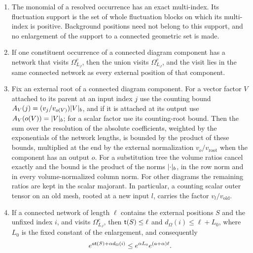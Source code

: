 \begin{lemma}
\begin{enumerate}
\[\]
\item The monomial of a resolved occurrence has an exact multi-index. Its fluctuation support is the set of whole fluctuation blocks on which its multi-index is positive. Background positions need not belong to this support, and no enlargement of the support to a connected geometric set is made.
\item If one constituent occurrence of a connected diagram component has a network that visits $\Omega^c_{L_J}$, then the union visits $\Omega^c_{L_J}$, and the visit lies in the same connected network as every external position of that component.
\item Fix an external root of a connected diagram component. For a vector factor $V$ attached to its parent at an input index $j$ use the counting bound $A_V(j)=(v_j/v_{o(V)})\lvert V\rvert_b$, and if it is attached at its output use $A_V(o(V))=\lvert V\rvert_b$; for a scalar factor use its counting-root bound. Then the sum over the resolution of the absolute coefficients, weighted by the exponentials of the network lengths, is bounded by the product of these bounds, multiplied at the end by the external normalization $v_{o}/v_{\mathrm{root}}$ when the component has an output $o$. For a substitution tree the volume ratios cancel exactly and the bound is the product of the norms $\lvert \cdot\rvert_b$, in the row norm and in every volume-normalized column norm. For other diagrams the remaining ratios are kept in the scalar majorant. In particular, a counting scalar outer tensor on an old mesh, rooted at a new input $l$, carries the factor $v_l/v_{\mathrm{old}}$.
\item If a connected network of length $\ell$ contains the external positions $S$ and the unfixed index $i$, and visits $\Omega^c_{L_J}$, then $\mathsf t(S)\le\ell$ and $d_\Omega(i)\le\ell+L_0$, where $L_0$ is the fixed constant of the enlargement, and consequently
\[
 e^{a\mathsf t(S)+\alpha d_\Omega(i)}\le e^{\alpha L_0}e^{(a+\alpha)\ell}.
\]
\end{enumerate}
\end{lemma}


